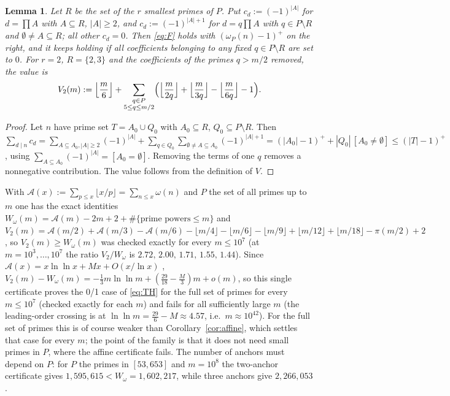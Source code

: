 \documentclass[11pt]{article}
\newtheorem{lemma}[theorem]{Lemma}
\theoremstyle{definition}
\begin{document}
\begin{lemma}\label{lem:family}
Let $R$ be the set of the $r$ smallest primes of $P$. Put $c_d:=(-1)^{|A|}$ for $d=\prod A$ with $A\subseteq R$, $|A|\ge2$,
and $c_d:=(-1)^{|A|+1}$ for $d=q\prod A$ with $q\in P\setminus R$ and $\emptyset\ne A\subseteq R$; all other $c_d=0$. Then
\eqref{eq:F} holds with $(\omega_P(n)-1)^+$ on the right, and it keeps holding if all coefficients belonging to any fixed
$q\in P\setminus R$ are set to $0$. For $r=2$, $R=\{2,3\}$ and the coefficients of the primes $q>m/2$ removed, the value is
\begin{equation}\label{eq:V2}
V_2(m):=\Bigl\lfloor\frac m6\Bigr\rfloor+\sum_{\substack{q\in P\\5\le q\le m/2}}\Bigl(\Bigl\lfloor\frac m{2q}\Bigr\rfloor+\Bigl\lfloor\frac m{3q}\Bigr\rfloor-\Bigl\lfloor\frac m{6q}\Bigr\rfloor-1\Bigr).
\end{equation}
\end{lemma}
\begin{proof}
Let $n$ have prime set $T=A_0\cup Q_0$ with $A_0\subseteq R$, $Q_0\subseteq P\setminus R$. Then
$\sum_{d\mid n}c_d=\sum_{A\subseteq A_0,|A|\ge2}(-1)^{|A|}+\sum_{q\in Q_0}\sum_{\emptyset\ne A\subseteq A_0}(-1)^{|A|+1}
=(|A_0|-1)^++|Q_0|\,[A_0\ne\emptyset]\le(|T|-1)^+$, using $\sum_{A\subseteq A_0}(-1)^{|A|}=[A_0=\emptyset]$. Removing the terms
of one $q$ removes a nonnegative contribution. The value follows from the definition of $V$.
\end{proof}

With $\mathcal A(x):=\sum_{p\le x}\lfloor x/p\rfloor=\sum_{n\le x}\omega(n)$ and $P$ the set of all primes up to $m$ one has the
exact identities $W_\omega(m)=\mathcal A(m)-2m+2+\#\{\text{prime powers}\le m\}$ and
$V_2(m)=\mathcal A(m/2)+\mathcal A(m/3)-\mathcal A(m/6)-\lfloor m/4\rfloor-\lfloor m/6\rfloor-\lfloor m/9\rfloor+\lfloor m/12\rfloor+\lfloor m/18\rfloor-\pi(m/2)+2$,
so $V_2(m)\ge W_\omega(m)$ was checked exactly for every $m\le10^7$ (at $m=10^3,\dots,10^7$ the ratio $V_2/W_\omega$ is $2.72,\,2.00,\,1.71,\,1.55,\,1.44$). Since
$\mathcal A(x)=x\ln\ln x+Mx+O(x/\ln x)$ \cite[Thm.~430]{HW}, $V_2(m)-W_\omega(m)=-\tfrac13m\ln\ln m+(\tfrac{29}{18}-\tfrac M3)m+o(m)$,
so this single certificate proves the 0/1 case of \eqref{eq:TH} for the full set of primes for every $m\le10^7$ (checked exactly for each $m$)
and fails for all sufficiently large $m$ (the leading-order crossing is at $\ln\ln m=\tfrac{29}6-M\approx4.57$, i.e.\ $m\approx10^{42}$).
For the full set of primes this is of course weaker than Corollary~\ref{cor:affine}, which settles that case for every $m$; the point of
the family is that it does not need small primes in $P$, where the affine certificate fails. The number of anchors must depend on $P$: for $P$ the primes in $[53,653]$ and
$m=10^8$ the two-anchor certificate gives $1{,}595{,}615<W_\omega=1{,}602{,}217$, while three anchors give $2{,}266{,}053$.
\end{document}
